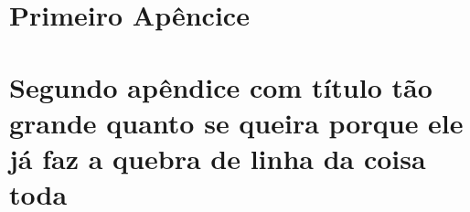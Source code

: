 
\begin{apendicesenv}

\partapendices

\chapter{Primeiro Apêncice}

\lipsum[50] %

\chapter{Segundo apêndice com título tão grande quanto se queira porque ele já faz a quebra de linha da coisa toda}
\lipsum[51-53] %

\end{apendicesenv}
